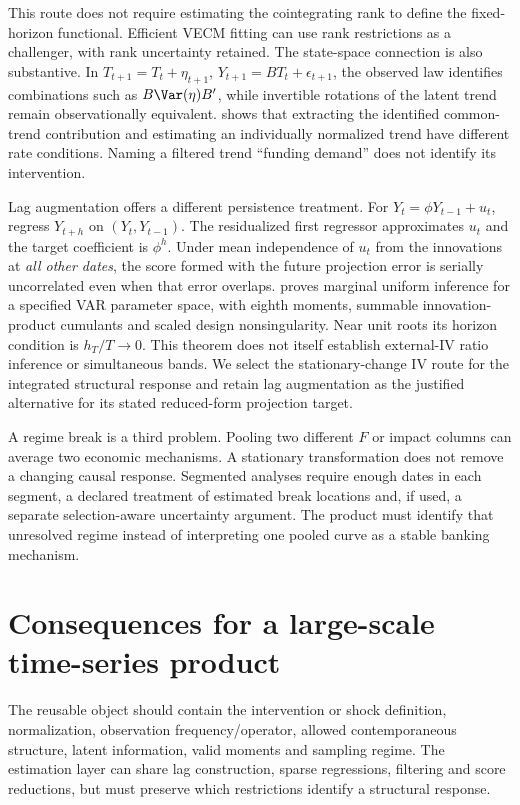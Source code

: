 This route does not require estimating the cointegrating rank to define
the fixed-horizon functional. Efficient VECM fitting can use rank
restrictions as a challenger, with rank uncertainty retained. The state-space
connection is also substantive. In $T_{t+1}=T_t+\eta_{t+1}$,
$Y_{t+1}=BT_t+\epsilon_{t+1}$, the observed law identifies combinations
such as $B\Var(\eta)B'$, while invertible rotations of the latent trend
remain observationally equivalent. \citet[Theorems 1--2]{johansen2017}
shows that extracting the identified common-trend contribution and
estimating an individually normalized trend have different rate conditions.
Naming a filtered trend ``funding demand'' does not identify its intervention.

Lag augmentation offers a different persistence treatment. For
$Y_t=\phi Y_{t-1}+u_t$, regress $Y_{t+h}$ on $(Y_t,Y_{t-1})$.
The residualized first regressor approximates $u_t$ and the target
coefficient is $\phi^h$. Under mean independence of $u_t$ from the
innovations at \emph{all other dates}, the score formed with the
future projection error is serially uncorrelated even when that error
overlaps. \citet[Definition 1, Assumptions 1--3, Proposition 1]{lpaug2020}
proves marginal uniform inference for a specified VAR parameter space,
with eighth moments, summable innovation-product cumulants and scaled
design nonsingularity. Near unit roots its horizon condition is
$h_T/T\to0$. This theorem does not itself establish external-IV ratio
inference or simultaneous bands. We select the stationary-change IV route
for the integrated structural response and retain lag augmentation as
the justified alternative for its stated reduced-form projection target.

A regime break is a third problem. Pooling two different $F$ or impact
columns can average two economic mechanisms. A stationary transformation
does not remove a changing causal response. Segmented analyses require
enough dates in each segment, a declared treatment of estimated break
locations and, if used, a separate selection-aware uncertainty argument.
The product must identify that unresolved regime instead of interpreting
one pooled curve as a stable banking mechanism.




\section{Consequences for a large-scale time-series product}
The reusable object should contain the intervention or shock definition,
normalization, observation frequency/operator, allowed contemporaneous
structure, latent information, valid moments and sampling regime.
The estimation layer can share lag construction, sparse regressions,
filtering and score reductions, but must preserve which restrictions
identify a structural response.

